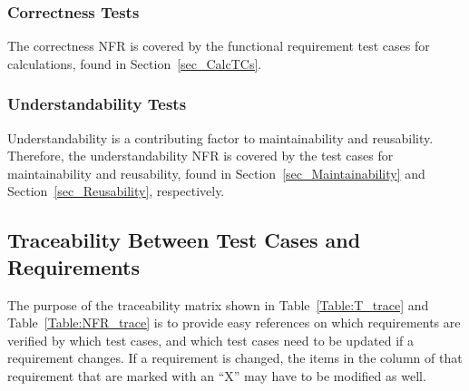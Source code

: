 \documentclass[12pt, titlepage]{article}
\begin{document}
\subsubsection{Correctness Tests}
The correctness NFR is covered by the functional requirement test cases for 
calculations, found in 
Section~\ref{sec_CalcTCs}.

\subsubsection{Understandability Tests}
Understandability is a contributing factor to maintainability and reusability. 
Therefore, the understandability NFR is covered by the test cases for 
maintainability and reusability, found in Section~\ref{sec_Maintainability} and 
Section~\ref{sec_Reusability}, respectively.

\subsection{Traceability Between Test Cases and Requirements}

\noindent The purpose of the traceability matrix shown in 
Table~\ref{Table:T_trace} and Table~\ref{Table:NFR_trace} is to provide easy 
references on which requirements are verified by which test cases, and which 
test cases need to be updated if a requirement changes.  If a requirement is 
changed, the items in the column of that requirement that are marked
with an ``X'' may have to be modified as well. 
\end{document}
